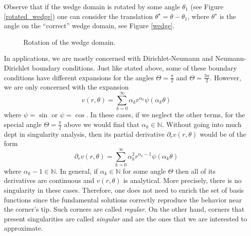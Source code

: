 \begin{remark}\label{particular_solutions}
    Observe that if the wedge domain is rotated by some angle \(\theta_1\) (see Figure \eqref{rotated_wedge}) one can consider the translation \(\theta^\star = \theta - \theta_1\), where \(\theta^\star\) is the angle on the ``correct'' wedge domain, see Figure \eqref{wedge}. 
    \begin{figure}[H]
        \centering
        \caption{Rotation of the wedge domain.}
        \label{rotated_wedge}
    \end{figure}
    In applications, we are mostly concerned with Dirichlet-Neumann and Neumann-Dirichlet boundary conditions. Just like stated above, some of these boundary conditions have different expansions for the angles \(\Theta=\frac{\pi}{2}\) and \(\Theta=\frac{3\pi}{2}\). However, we are only concerned with the expansion
    \[
        v(r,\theta) = \sum_{k=0}^{\infty}\alpha_k r^{\alpha_k}\psi(\alpha_k \theta)
    \]
    where \(\psi=\sin\) or \(\psi = \cos\). In these cases, if we neglect the other terms, for the special angle \(\Theta = \frac{\pi}{2}\) above we would find that \(\alpha_k \in \mathbb{N}\). Without going into much dept in singularity analysis, then its partial derivative \(\partial_r v(r,\theta)\) would be of the form 
    \[
        \partial_r v(r,\theta) = \sum_{k=0}^{\infty}\alpha_k^2 r^{\alpha_k-1}\psi(\alpha_k \theta)
    \]
    where \(\alpha_k-1 \in \mathbb{N}\). In general, if \(\alpha_k \in \mathbb{N}\) for some angle \(\Theta\) then all of its derivatives are continuous and \(v(r,\theta)\) is analytical. More precisely, there is no singularity in these cases. Therefore, one does not need to enrich the set of basis functions since the fundamental solutions correctly reproduce the behavior near the corner's tip. Such corners are called \textit{regular}. On the other hand, corners that present singularities are called \textit{singular} and are the ones that we are interested to approximate. 


\end{remark}
